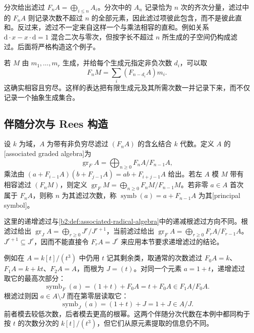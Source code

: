 \ProseParagraphBreak
分次给出滤过 \(F_nA=\bigoplus_{i\le n}A_i\)。分次中的 \(A_n\) 记录恰为 \(n\) 次的齐次分量，滤过中的 \(F_nA\) 则记录次数不超过 \(n\) 的全部元素，因此滤过项彼此包含，而不是彼此直和。反过来，滤过不一定来自这样一个与乘法相容的直和。例如关系 \(\mathrm{d}\cdot x-x\cdot\mathrm{d}=1\) 混合二次与零次，但按字长不超过 \(n\) 所生成的子空间仍构成滤过。后面将严格构造这个例子。

\ProseParagraphBreak
若 \(M\) 由 \(m_1,\ldots,m_r\) 生成，并给每个生成元指定非负次数 \(d_i\)，可以取
\[
	F_nM=\sum_i(F_{n-d_i}A)m_i.
\]
这确实相容且穷尽。这样的表达把有限生成元及其所需次数一并记录下来，而不仅记录一个抽象生成集合。

\subsection{伴随分次与 Rees 构造}
\label{b2:subsec:2001:02}

\begin{definition}\label{b2:def:associated-graded-rees}
	设 \(k\) 为域，\(A\) 为带有非负穷尽滤过 \((F_nA)\) 的含幺结合 \(k\) 代数。定义 \(A\) 的[associated graded algebra]为
	\[
		\operatorname{gr}_F A=\bigoplus_{n\ge0}F_nA/F_{n-1}A,
	\]
	乘法由 \((a+F_{i-1}A)(b+F_{j-1}A)=ab+F_{i+j-1}A\) 给出。若左 \(A\) 模 \(M\) 带有相容滤过 \((F_nM)\)，则定义 \(\operatorname{gr}_F M=\bigoplus_{n\geq0}F_nM/F_{n-1}M\)。若非零 \(a\in A\) 首次属于 \(F_nA\)，则称 \(n\) 为其滤过次数，称 \(\operatorname{symb}(a)=a+F_{n-1}A\) 为其[principal symbol]。
\end{definition}

这里的递增滤过与\cref{b2:def:associated-radical-algebra}中的递减根滤过方向不同。根滤过给出 \(\operatorname{gr}_J A=\bigoplus_{r\ge0}J^r/J^{r+1}\)，当前滤过给出 \(\operatorname{gr}_F A=\bigoplus_{r\ge0}F_rA/F_{r-1}A\)。\(J^{r+1}\subseteq J^r\)，因而不能直接令 \(F_rA=J^r\) 来应用本节要求递增滤过的结论。

\ProseParagraphBreak
例如在 \(A=k[t]/(t^3)\) 中仍用 \(t\) 记其剩余类，取通常的次数滤过 \(F_0A=k\)、\(F_1A=k+kt\)、\(F_2A=A\)，而根为 \(J=(t)\)。对同一个元素 \(a=1+t\)，递增滤过取它的最高次部分：
\[
	\operatorname{symb}_F(a)=(1+t)+F_0A=t+F_0A \in F_1A/F_0A.
\]
根滤过则因 \(a\in A\setminus J\) 而在第零层读取它：
\[
	\operatorname{symb}_J(a)=(1+t)+J=1+J\in A/J.
\]
前者模去较低次数，后者模去更高的根幂。这两个伴随分次代数在本例中都同构于按 \(t\) 的次数分次的 \(k[t]/(t^3)\)，但它们从原元素提取的信息仍不同。

